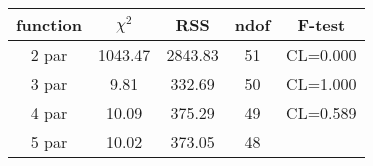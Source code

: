 \begin{tabular}{c|c|c|c|c}
function & $\chi^2$ & RSS & ndof & F-test \\
\hline
2 par & 1043.47 & 2843.83 & 51 & CL=0.000 \\
3 par & 9.81 & 332.69 & 50 & CL=1.000 \\
4 par & 10.09 & 375.29 & 49 & CL=0.589 \\
5 par & 10.02 & 373.05 & 48 & \\
\hline
\end{tabular}